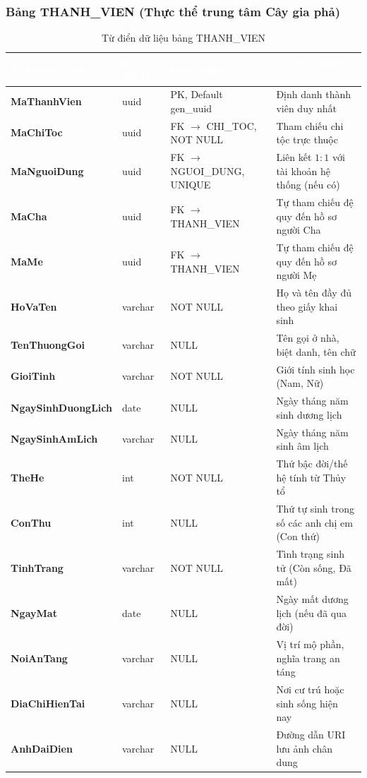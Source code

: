 \subsubsection{Bảng THANH\_VIEN (Thực thể trung tâm Cây gia phả)}
\begin{table}[H]
\centering\small
\renewcommand{\arraystretch}{1.3}
\begin{tabularx}{\textwidth}{|>{\raggedright\arraybackslash\bfseries}p{3.4cm}|>{\raggedright\arraybackslash}p{2.2cm}|>{\raggedright\arraybackslash}p{3.4cm}|>{\raggedright\arraybackslash}X|}
\hline
\rowcolor{tableheader}
\textcolor{white}{\textbf{Tên thuộc tính}} & \textcolor{white}{\textbf{Kiểu vật lý}} & \textcolor{white}{\textbf{Ràng buộc}} & \textcolor{white}{\textbf{Ý nghĩa nghiệp vụ}} \\
\hline
MaThanhVien & uuid & PK, Default gen\_uuid & Định danh thành viên duy nhất \\
\hline
MaChiToc & uuid & FK $\to$ CHI\_TOC, NOT NULL & Tham chiếu chi tộc trực thuộc \\
\hline
MaNguoiDung & uuid & FK $\to$ NGUOI\_DUNG, UNIQUE & Liên kết $1:1$ với tài khoản hệ thống (nếu có) \\
\hline
MaCha & uuid & FK $\to$ THANH\_VIEN & Tự tham chiếu đệ quy đến hồ sơ người Cha \\
\hline
MaMe & uuid & FK $\to$ THANH\_VIEN & Tự tham chiếu đệ quy đến hồ sơ người Mẹ \\
\hline
HoVaTen & varchar & NOT NULL & Họ và tên đầy đủ theo giấy khai sinh \\
\hline
TenThuongGoi & varchar & NULL & Tên gọi ở nhà, biệt danh, tên chữ \\
\hline
GioiTinh & varchar & NOT NULL & Giới tính sinh học (Nam, Nữ) \\
\hline
NgaySinhDuongLich & date & NULL & Ngày tháng năm sinh dương lịch \\
\hline
NgaySinhAmLich & varchar & NULL & Ngày tháng năm sinh âm lịch \\
\hline
TheHe & int & NOT NULL & Thứ bậc đời/thế hệ tính từ Thủy tổ \\
\hline
ConThu & int & NULL & Thứ tự sinh trong số các anh chị em (Con thứ) \\
\hline
TinhTrang & varchar & NOT NULL & Tình trạng sinh tử (Còn sống, Đã mất) \\
\hline
NgayMat & date & NULL & Ngày mất dương lịch (nếu đã qua đời) \\
\hline
NoiAnTang & varchar & NULL & Vị trí mộ phần, nghĩa trang an táng \\
\hline
DiaChiHienTai & varchar & NULL & Nơi cư trú hoặc sinh sống hiện nay \\
\hline
AnhDaiDien & varchar & NULL & Đường dẫn URI lưu ảnh chân dung \\
\hline
\end{tabularx}
\caption{Từ điển dữ liệu bảng THANH\_VIEN}
\label{tab:dict_thanh_vien}
\end{table}

